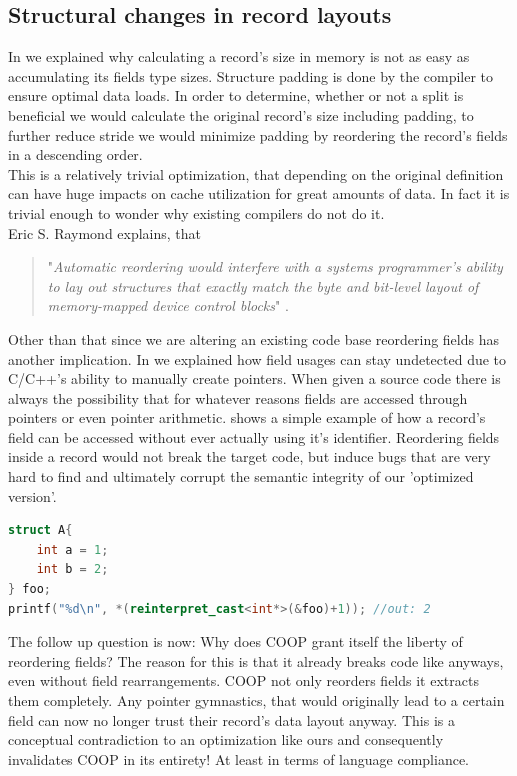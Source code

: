\subsection{Structural changes in record layouts}\label{scirl}
In  we explained why calculating a record's size in memory is not as easy as accumulating its fields type sizes. Structure padding is done by the compiler to ensure optimal data loads. In order to determine, whether or not a split is beneficial we would calculate the original record's size including padding, to further reduce stride we would minimize padding by reordering the record's fields in a descending order.\\
This is a relatively trivial optimization, that depending on the original definition can have huge impacts on cache utilization for great amounts of data. In fact it is trivial enough to wonder why existing compilers do not do it.\\
Eric S. Raymond explains, that
\begin{quote}
	"\textit{Automatic reordering would interfere with a systems programmer’s ability to lay out structures that exactly match the byte and bit-level layout of memory-mapped device control blocks}" .
\end{quote}
Other than that since we are altering an existing code base reordering fields has another implication. In  we explained how field usages can stay undetected due to C/C++'s ability to manually create pointers. When given a source code there is always the possibility that for whatever reasons fields are accessed through pointers or even pointer arithmetic.  shows a simple example of how a record's field can be accessed without ever actually using it's identifier. Reordering fields inside a record would not break the target code, but induce bugs that are very hard to find and ultimately corrupt the semantic integrity of our 'optimized version'.
\begin{lstlisting}[language=C++, name={Simple example of why automated field rearrangements can not be considered legal.}, label={pointer_arithmetic_access}]
struct A{
	int a = 1;
	int b = 2;
} foo;
printf("%d\n", *(reinterpret_cast<int*>(&foo)+1)); //out: 2
\end{lstlisting}
The follow up question is now: Why does COOP grant itself the liberty of reordering fields? The reason for this is that it already breaks code like  anyways, even without field rearrangements. COOP not only reorders fields it extracts them completely. Any pointer gymnastics, that would originally lead to a certain field can now no longer trust their record's data layout anyway. This is a conceptual contradiction to an optimization like ours and consequently invalidates COOP in its entirety! At least in terms of language compliance.\\\\
